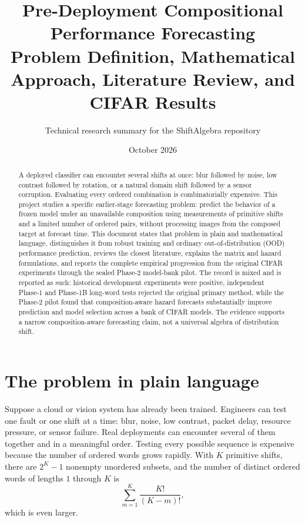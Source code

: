 \documentclass[11pt,a4paper]{article}
\title{\textbf{Pre-Deployment Compositional Performance Forecasting}\\
\large Problem Definition, Mathematical Approach, Literature Review, and CIFAR Results}
\author{Technical research summary for the ShiftAlgebra repository}
\date{October 2026}
\begin{document}
\maketitle

\begin{abstract}
A deployed classifier can encounter several shifts at once: blur followed by
noise, low contrast followed by rotation, or a natural domain shift followed by
a sensor corruption.  Evaluating every ordered combination is combinatorially
expensive.  This project studies a specific earlier-stage forecasting problem:
predict the behavior of a frozen model under an unavailable composition using
measurements of primitive shifts and a limited number of ordered pairs, without
processing images from the composed target at forecast time.  This document
states that problem in plain and mathematical language, distinguishes it from
robust training and ordinary out-of-distribution (OOD) performance prediction,
reviews the closest literature, explains the matrix and hazard formulations,
and reports the complete empirical progression from the original CIFAR
experiments through the sealed Phase-2 model-bank pilot.  The record is mixed
and is reported as such: historical development experiments were positive,
independent Phase-1 and Phase-1B long-word tests rejected the original primary
method, while the Phase-2 pilot found that composition-aware hazard forecasts
substantially improve prediction and model selection across a bank of CIFAR
models.  The evidence supports a narrow composition-aware forecasting claim,
not a universal algebra of distribution shift.
\end{abstract}

\tableofcontents
\newpage

\section{The problem in plain language}

Suppose a cloud or vision system has already been trained.  Engineers can test
one fault or one shift at a time: blur, noise, low contrast, packet delay,
resource pressure, or sensor failure.  Real deployments can encounter several
of them together and in a meaningful order.  Testing every possible sequence
is expensive because the number of ordered words grows rapidly.  With $K$
primitive shifts, there are $2^K-1$ nonempty unordered subsets, and the number
of distinct ordered words of lengths $1$ through $K$ is
\[
\sum_{m=1}^{K}\frac{K!}{(K-m)!},
\]
which is even larger.
\end{document}
